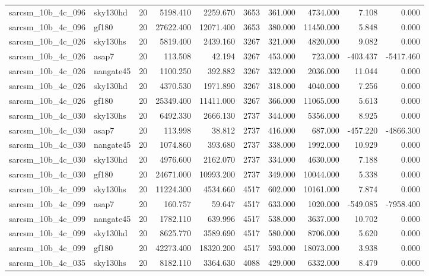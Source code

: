 \begin{longtable}{llrrrrrrrr}
sarcsm\_10b\_4c\_096 & sky130hd & 20 & 5198.410 & 2259.670 & 3653 & 361.000 & 4734.000 & 7.108 & 0.000 \\
sarcsm\_10b\_4c\_096 & gf180 & 20 & 27622.400 & 12071.400 & 3653 & 380.000 & 11450.000 & 5.848 & 0.000 \\
sarcsm\_10b\_4c\_026 & sky130hs & 20 & 5819.400 & 2439.160 & 3267 & 321.000 & 4820.000 & 9.082 & 0.000 \\
sarcsm\_10b\_4c\_026 & asap7 & 20 & 113.508 & 42.194 & 3267 & 453.000 & 723.000 & -403.437 & -5417.460 \\
sarcsm\_10b\_4c\_026 & nangate45 & 20 & 1100.250 & 392.882 & 3267 & 332.000 & 2036.000 & 11.044 & 0.000 \\
sarcsm\_10b\_4c\_026 & sky130hd & 20 & 4370.530 & 1971.890 & 3267 & 318.000 & 4040.000 & 7.256 & 0.000 \\
sarcsm\_10b\_4c\_026 & gf180 & 20 & 25349.400 & 11411.000 & 3267 & 366.000 & 11065.000 & 5.613 & 0.000 \\
sarcsm\_10b\_4c\_030 & sky130hs & 20 & 6492.330 & 2666.130 & 2737 & 344.000 & 5356.000 & 8.925 & 0.000 \\
sarcsm\_10b\_4c\_030 & asap7 & 20 & 113.998 & 38.812 & 2737 & 416.000 & 687.000 & -457.220 & -4866.300 \\
sarcsm\_10b\_4c\_030 & nangate45 & 20 & 1074.860 & 393.680 & 2737 & 338.000 & 1992.000 & 10.929 & 0.000 \\
sarcsm\_10b\_4c\_030 & sky130hd & 20 & 4976.600 & 2162.070 & 2737 & 334.000 & 4630.000 & 7.188 & 0.000 \\
sarcsm\_10b\_4c\_030 & gf180 & 20 & 24671.000 & 10993.200 & 2737 & 349.000 & 10044.000 & 5.338 & 0.000 \\
sarcsm\_10b\_4c\_099 & sky130hs & 20 & 11224.300 & 4534.660 & 4517 & 602.000 & 10161.000 & 7.874 & 0.000 \\
sarcsm\_10b\_4c\_099 & asap7 & 20 & 160.757 & 59.647 & 4517 & 633.000 & 1020.000 & -549.085 & -7958.400 \\
sarcsm\_10b\_4c\_099 & nangate45 & 20 & 1782.110 & 639.996 & 4517 & 538.000 & 3637.000 & 10.702 & 0.000 \\
sarcsm\_10b\_4c\_099 & sky130hd & 20 & 8625.770 & 3589.690 & 4517 & 580.000 & 8706.000 & 5.620 & 0.000 \\
sarcsm\_10b\_4c\_099 & gf180 & 20 & 42273.400 & 18320.200 & 4517 & 593.000 & 18073.000 & 3.938 & 0.000 \\
sarcsm\_10b\_4c\_035 & sky130hs & 20 & 8182.110 & 3364.630 & 4088 & 429.000 & 6332.000 & 8.479 & 0.000 \\

\end{longtable}
